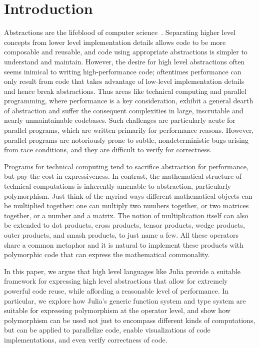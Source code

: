 \documentclass{sig-alternate}
\begin{document}



\section{Introduction}

Abstractions are the lifeblood of computer science~\cite{Abelson1996}.
Separating higher level concepts from lower level implementation details allows
code to be more composable and reusable, and code using appropriate
abstractions is simpler to understand and maintain. However, the desire for
high level abstractions often seems inimical to writing high-performance code;
oftentimes performance can only result from code that takes advantage of
low-level implementation details and hence break abstractions. Thus areas like
technical computing and parallel programming, where performance is a key
consideration, exhibit a general dearth of abstraction and suffer the
consequent complexities in large, inscrutable and nearly unmaintainable
codebases. Such challenges are particularly acute for parallel programs, which
are written primarily for performance reasons. However, parallel programs are
notoriously prone to subtle, nondeterministic bugs arising from race
conditions, and they are difficult to verify for correctness. 

Programs for technical computing tend to sacrifice abstraction for performance,
but pay the cost in expressiveness. In contrast, the mathematical structure of
technical computations is inherently amenable to abstraction, particularly
polymorphism. Just think of the myriad ways different mathematical objects can
be multiplied together: one can multiply two numbers together, or two matrices
together, or a number and a matrix. The notion of multiplication itself can
also be extended to dot products, cross products, tensor products, wedge
products, outer products, and smash products, to just name a few. All these
operators share a common metaphor and it is natural to implement these products
with polymorphic code that can express the mathematical commonality.

In this paper, we argue that high level languages like Julia provide a suitable
framework for expressing high level abstractions that allow for extremely
powerful code reuse, while affording a reasonable level of performance.
In particular, we explore how Julia's generic function system and type system
are suitable for expressing polymorphism at the operator level, and show
how polymorphism can be used not just to encompass different kinds of
computations, but can be applied to parallelize code, enable visualizations of
code implementations, and even verify correctness of code.
\end{document}
